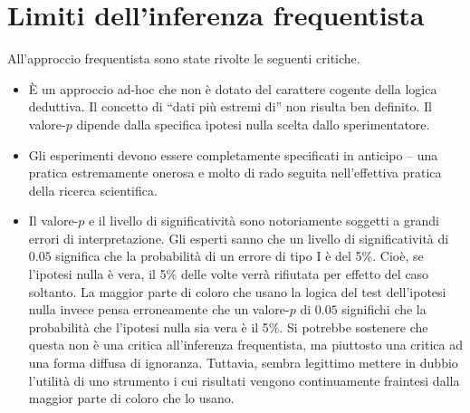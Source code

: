 
\section{Limiti dell'inferenza frequentista}

All'approccio frequentista sono state rivolte le seguenti critiche.

\begin{itemize}
\item È un approccio ad-hoc che non è dotato del carattere cogente della logica deduttiva. 
Il concetto di ``dati più estremi di'' non risulta ben definito. 
Il valore-$p$ dipende dalla specifica ipotesi nulla scelta dallo sperimentatore.
\item Gli esperimenti devono essere completamente specificati in anticipo -- una pratica estremamente onerosa e molto di rado seguita nell'effettiva pratica della ricerca scientifica.
\item Il valore-$p$ e il livello di significatività sono notoriamente soggetti a grandi errori di interpretazione. 
Gli esperti sanno che un livello di significatività di $0.05$ significa che la probabilità di un errore di tipo I è del 5\%. 
Cioè, se l'ipotesi nulla è vera, il 5\% delle volte verrà rifiutata per effetto del caso soltanto. 
La maggior parte di coloro che usano la logica del test dell'ipotesi nulla invece pensa erroneamente che un valore-$p$ di $0.05$ significhi che la probabilità che l'ipotesi nulla sia vera è il 5\%.
Si potrebbe sostenere che questa non è una critica all'inferenza frequentista, ma piuttosto una critica ad una forma diffusa di ignoranza. 
Tuttavia, sembra legittimo mettere in dubbio l'utilità di uno strumento i cui risultati vengono continuamente fraintesi dalla maggior parte di coloro che lo usano. 
\end{itemize}

